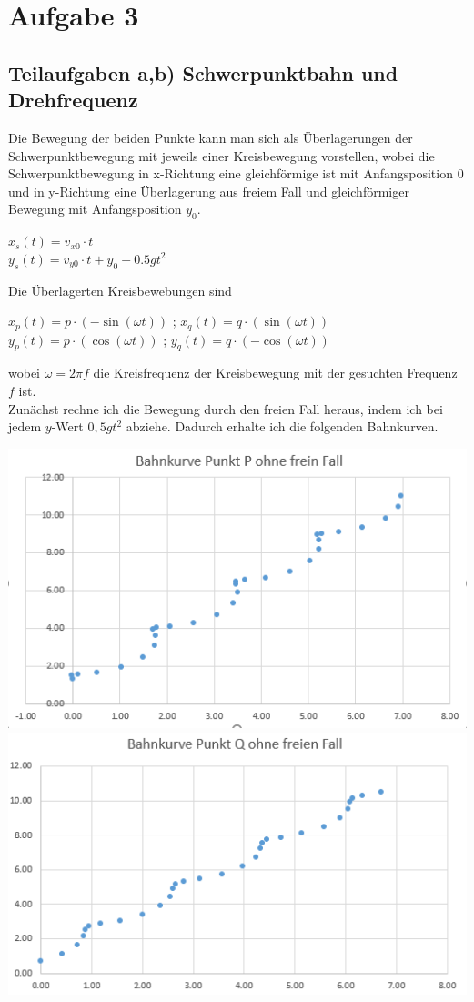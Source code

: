 \documentclass{article}
\begin{document}
\section*{Aufgabe 3}
\subsection*{Teilaufgaben a,b) Schwerpunktbahn und Drehfrequenz}
Die Bewegung der beiden Punkte kann man sich als Überlagerungen der Schwerpunktbewegung mit jeweils einer Kreisbewegung vorstellen, wobei die Schwerpunktbewegung in x-Richtung eine gleichförmige ist mit 
Anfangsposition 0 und in y-Richtung eine Überlagerung aus freiem Fall und gleichförmiger Bewegung mit Anfangsposition $y_0$.
\begin{center}
	$x_s (t)= v_{x0}\cdot t$ \\
	$y_s (t) = v_{y0}\cdot t + y_0 -0.5 g t^2$
\end{center}   
Die Überlagerten Kreisbewebungen sind
\begin{center}
	$x_p (t) = p \cdot (-\sin(\omega t))$ ; $x_q (t)= q \cdot (\sin(\omega t)) $\\
	$y_p (t) = p \cdot (\cos(\omega t))$ ; $y_q (t)= q \cdot (-\cos(\omega t)) $
\end{center} 
wobei $\omega = 2\pi f $ die Kreisfrequenz der Kreisbewegung mit der gesuchten Frequenz $f$ ist.\\
Zunächst rechne ich die Bewegung durch den freien Fall heraus, 
indem ich bei jedem $y$-Wert $0,5gt^2$ abziehe. Dadurch erhalte ich die folgenden Bahnkurven.
\begin{center}
	\includegraphics[scale=0.38]{Kurve-P-Punkt-ohne-freien-Fall.png}
	\includegraphics[scale=0.42]{Kurve-Q-Punkt-ohne-freien-Fall.png}
\end{center}
\end{document}
